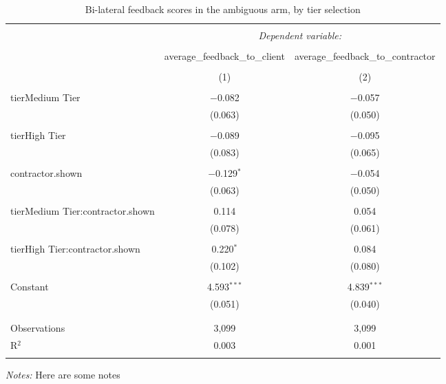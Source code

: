 
\begin{table}[!htbp] \centering 
  \caption{Bi-lateral feedback scores in the ambiguous arm, by tier selection} 
  \label{tab:feedback_cond} 
\begin{tabular}{@{\extracolsep{5pt}}lcc} 
\\[-1.8ex]\hline 
\hline \\[-1.8ex] 
 & \multicolumn{2}{c}{\textit{Dependent variable:}} \\ 
\cline{2-3} 
\\[-1.8ex] & average\_feedback\_to\_client & average\_feedback\_to\_contractor \\ 
\\[-1.8ex] & (1) & (2)\\ 
\hline \\[-1.8ex] 
 tierMedium Tier & $-$0.082 & $-$0.057 \\ 
  & (0.063) & (0.050) \\ 
  & & \\ 
 tierHigh Tier & $-$0.089 & $-$0.095 \\ 
  & (0.083) & (0.065) \\ 
  & & \\ 
 contractor.shown & $-$0.129$^{*}$ & $-$0.054 \\ 
  & (0.063) & (0.050) \\ 
  & & \\ 
 tierMedium Tier:contractor.shown & 0.114 & 0.054 \\ 
  & (0.078) & (0.061) \\ 
  & & \\ 
 tierHigh Tier:contractor.shown & 0.220$^{*}$ & 0.084 \\ 
  & (0.102) & (0.080) \\ 
  & & \\ 
 Constant & 4.593$^{***}$ & 4.839$^{***}$ \\ 
  & (0.051) & (0.040) \\ 
  & & \\ 
\hline \\[-1.8ex] 
Observations & 3,099 & 3,099 \\ 
R$^{2}$ & 0.003 & 0.001 \\ 
\hline 
\hline \\[-1.8ex] 
\end{tabular}
\begin{minipage}{0.9\linewidth} 
 \emph{Notes:} Here are some notes
 \end{minipage}
\end{table}
